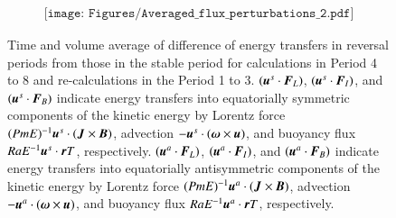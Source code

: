 \begin{figure}[ht]
\begin{center}
\[
\begin{array}{c}
\texttt{[image: Figures/Averaged\_flux\_perturbations\_2.pdf]}
\end{array}
\]
\end{center}
\caption{
 Time and volume average of difference of energy transfers in reversal periods from those in the stable period for calculations in Period 4 to 8 and re-calculations in the Period 1 to 3.
$(\mbox{\boldmath$u$}^s \cdot \mbox{\boldmath$F$}_{L})$, $(\mbox{\boldmath$u$}^s \cdot \mbox{\boldmath$F$}_{I})$, and $(\mbox{\boldmath$u$}^s \cdot \mbox{\boldmath$F$}_{B})$ indicate energy transfers into equatorially symmetric components of the kinetic energy by Lorentz force $(Pm E)^{-1} \mbox{\boldmath$u$}^s \cdot (\mbox{\boldmath$J$} \times \mbox{\boldmath$B$})$, advection $-\mbox{\boldmath$u$}^s \cdot(\mbox{\boldmath$\omega$} \times \mbox{\boldmath$u$})$, and buoyancy flux $Ra E^{-1} \mbox{\boldmath$u$}^s \cdot \mbox{\boldmath$r$} T$, respectively. 
$(\mbox{\boldmath$u$}^a \cdot \mbox{\boldmath$F$}_{L})$, $(\mbox{\boldmath$u$}^a \cdot \mbox{\boldmath$F$}_{I})$, and $(\mbox{\boldmath$u$}^a \cdot \mbox{\boldmath$F$}_{B})$ indicate energy transfers into equatorially antisymmetric components of the kinetic energy by Lorentz force $(Pm E)^{-1} \mbox{\boldmath$u$}^a \cdot (\mbox{\boldmath$J$} \times \mbox{\boldmath$B$})$, advection $-\mbox{\boldmath$u$}^a \cdot(\mbox{\boldmath$\omega$} \times \mbox{\boldmath$u$})$, and buoyancy flux $Ra E^{-1} \mbox{\boldmath$u$}^a \cdot \mbox{\boldmath$r$} T$, respectively. 
}
\label{Fig:Change_flux_summary_6grp}
\end{figure}